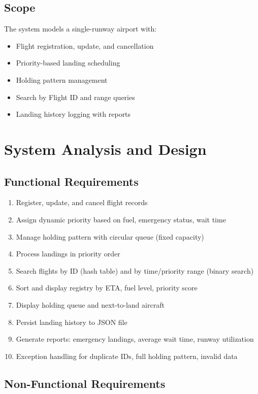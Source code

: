 \documentclass[12pt,a4paper]{article}
\begin{document}
\subsection{Scope}

The system models a single-runway airport with:
\begin{itemize}
    \item Flight registration, update, and cancellation
    \item Priority-based landing scheduling
    \item Holding pattern management
    \item Search by Flight ID and range queries
    \item Landing history logging with reports
\end{itemize}

\section{System Analysis and Design}

\subsection{Functional Requirements}

\begin{enumerate}
    \item Register, update, and cancel flight records
    \item Assign dynamic priority based on fuel, emergency status, wait time
    \item Manage holding pattern with circular queue (fixed capacity)
    \item Process landings in priority order
    \item Search flights by ID (hash table) and by time/priority range (binary search)
    \item Sort and display registry by ETA, fuel level, priority score
    \item Display holding queue and next-to-land aircraft
    \item Persist landing history to JSON file
    \item Generate reports: emergency landings, average wait time, runway utilization
    \item Exception handling for duplicate IDs, full holding pattern, invalid data
\end{enumerate}

\subsection{Non-Functional Requirements}
\end{document}
